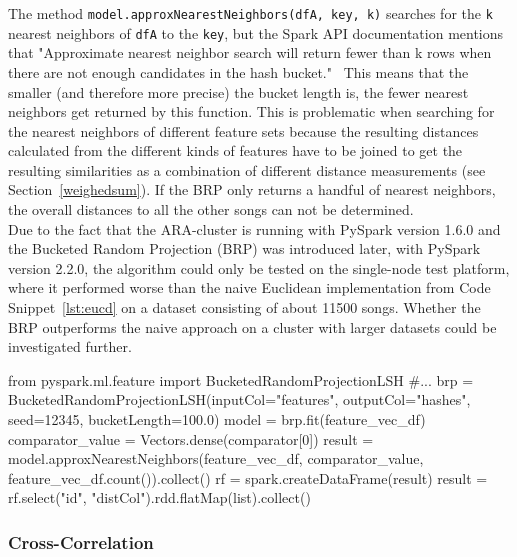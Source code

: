 \noindent The method \lstinline{model.approxNearestNeighbors(dfA, key, k)} searches for the \lstinline{k} nearest neighbors of \lstinline{dfA} to the \lstinline{key}, but the Spark API documentation mentions that "Approximate nearest neighbor search will return fewer than k rows when there are not enough candidates in the hash bucket."~\cite{lshspark}
This means that the smaller (and therefore more precise) the bucket length is, the fewer nearest neighbors get returned by this function. This is problematic when searching for the nearest neighbors of different feature sets because the resulting distances calculated from the different kinds of features have to be joined to get the resulting similarities as a combination of different distance measurements (see Section~\ref{weighedsum}). If the BRP only returns a handful of nearest neighbors, the overall distances to all the other songs can not be determined.\\
\noindent Due to the fact that the ARA-cluster is running with PySpark version 1.6.0 and the Bucketed Random Projection (BRP) was introduced later, with PySpark version 2.2.0, the algorithm could only be tested on the single-node test platform, where it performed worse than the naive Euclidean implementation from Code Snippet~\ref{lst:eucd} on a dataset consisting of about 11500 songs. Whether the BRP outperforms the naive approach on a cluster with larger datasets could be investigated further. 

\begin{pythonCode}[frame=single,label={lst:brp},caption={Bucketed Random Projection},captionpos=b]
from pyspark.ml.feature import BucketedRandomProjectionLSH
#...
brp = BucketedRandomProjectionLSH(inputCol="features", outputCol="hashes", seed=12345, bucketLength=100.0)
model = brp.fit(feature_vec_df)
comparator_value = Vectors.dense(comparator[0])
result = model.approxNearestNeighbors(feature_vec_df, comparator_value, feature_vec_df.count()).collect()
rf = spark.createDataFrame(result)
result = rf.select("id", "distCol").rdd.flatMap(list).collect()
\end{pythonCode}

 

\subsubsection{Cross-Correlation}

